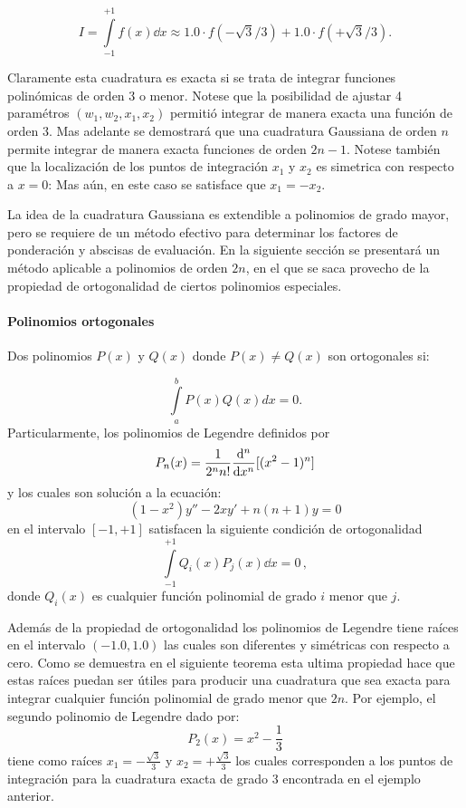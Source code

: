 \[I = \int\limits_{-1}^{+1} f(x) \dd{x}  \approx 1.0 \cdot f(-\sqrt{3}/3) + 1.0 
\cdot f(+\sqrt{3}/3).\]

Claramente esta cuadratura es exacta si se trata de integrar funciones polinómicas de orden 3 o menor. Notese que la posibilidad de ajustar 4 paramétros $(w_1, w_2, x_1, x_2)$ permitió integrar de manera exacta una función de orden $3$. Mas adelante se demostrará que una cuadratura Gaussiana de orden $n$ permite integrar de manera exacta funciones de orden $2n-1$. Notese también que la localización de los puntos de integración $x_1$ y $x_2$ es simetrica con respecto a $x=0$: Mas aún, en este caso se satisface que $x_1 = - x_2$.

La idea de la cuadratura Gaussiana es extendible a polinomios de grado mayor, 
pero se requiere de un método efectivo para determinar los factores de
ponderación y abscisas de evaluación. En la siguiente sección se presentará un 
método aplicable a polinomios de orden $2n$, en el que se saca provecho de la 
propiedad de ortogonalidad de ciertos polinomios especiales.

\paragraph*{Polinomios ortogonales}
Dos polinomios $P(x)$ y $Q(x)$ donde $P(x) \ne Q(x)$ son ortogonales si:

\[\int\limits_a^b {P(x)Q(x)} dx = 0.\]
Particularmente, los polinomios de Legendre definidos por
\[P_n(x) = \frac{1}{2^n n!}\dv[n]{x} [(x^2 - 1)^n]\]
y los cuales son solución a la ecuación:
\[(1 - {x^2}) y'' - 2x y' + n(n + 1)y = 0\]
en el intervalo $[-1,+1]$ satisfacen la siguiente condición de ortogonalidad
\[\int\limits_{ - 1}^{ + 1} {{Q_i}(x)} {P_j}(x)\dd{x} = 0\, ,\]
donde  ${{Q_i}(x)}$ es cualquier función polinomial de grado $i$ menor que $j$.

Además de la propiedad de ortogonalidad los polinomios de Legendre tiene raíces 
en el intervalo $(-1.0, 1.0)$ las cuales son diferentes y simétricas con 
respecto a cero. Como se demuestra en el siguiente teorema esta ultima propiedad hace que estas raíces puedan ser útiles 
para producir una cuadratura que sea exacta para integrar cualquier función 
polinomial de grado menor que $2n$. Por ejemplo, el segundo polinomio de 
Legendre dado por:
\[{P_2}(x) = {x^2} - \frac{1}{3}\]
tiene como raíces $x_1 =  - \frac{\sqrt{3}}{3}$ y $x_2 =  +\frac{\sqrt{3}}{3}$ 
los cuales corresponden a los puntos de integración para la cuadratura
exacta de grado 3 encontrada en el ejemplo anterior.

